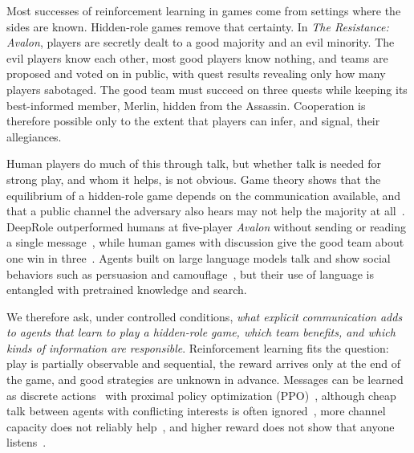 \documentclass[10pt,letterpaper]{article}
\makeatletter
\renewcommand{\section}{\@startsection{section}{1}{0pt}{-2.0ex plus -0.5ex minus -.2ex}{1.2ex plus .2ex}{\large\bfseries\raggedright}}
\makeatother
\begin{document}
\section{Introduction}
\label{sec:intro}

Most successes of reinforcement learning in games come from settings where the sides are known. Hidden-role games remove that certainty. In \emph{The Resistance: Avalon}, players are secretly dealt to a good majority and an evil minority. The evil players know each other, most good players know nothing, and teams are proposed and voted on in public, with quest results revealing only how many players sabotaged. The good team must succeed on three quests while keeping its best-informed member, Merlin, hidden from the Assassin. Cooperation is therefore possible only to the extent that players can infer, and signal, their allegiances.

Human players do much of this through talk, but whether talk is needed for strong play, and whom it helps, is not obvious. Game theory shows that the equilibrium of a hidden-role game depends on the communication available, and that a public channel the adversary also hears may not help the majority at all~\citep{carminati2026hidden}. DeepRole outperformed humans at five-player \emph{Avalon} without sending or reading a single message~\citep{serrino2019deeprole}, while human games with discussion give the good team about one win in three~\citep{nakamura2017percival}. Agents built on large language models talk and show social behaviors such as persuasion and camouflage~\citep{lan2024avalon,light2025strategist}, but their use of language is entangled with pretrained knowledge and search.

We therefore ask, under controlled conditions, \emph{what explicit communication adds to agents that learn to play a hidden-role game, which team benefits, and which kinds of information are responsible}. Reinforcement learning fits the question: play is partially observable and sequential, the reward arrives only at the end of the game, and good strategies are unknown in advance. Messages can be learned as discrete actions~\citep{foerster2016learning} with proximal policy optimization (PPO)~\citep{schulman2017ppo,yu2022mappo}, although cheap talk between agents with conflicting interests is often ignored~\citep{cao2018emergent}, more channel capacity does not reliably help~\citep{brandizzi2021rlupus}, and higher reward does not show that anyone listens~\citep{lowe2019pitfalls}.
\end{document}
